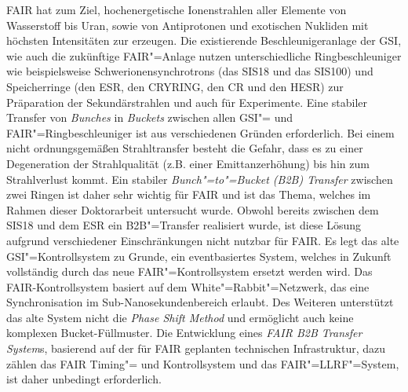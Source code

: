 FAIR hat zum Ziel, hochenergetische Ionenstrahlen aller Elemente von Wasserstoff bis Uran, sowie von Antiprotonen und exotischen Nukliden mit h\"ochsten  Intensit\"aten zur erzeugen. Die existierende Beschleunigeranlage der GSI, wie auch die zukünftige FAIR"=Anlage nutzen unterschiedliche Ringbeschleuniger wie beispielsweise Schwerionensynchrotrons (das SIS18 und das SIS100) und Speicherringe (den ESR, den CRYRING, den CR und den HESR) zur Pr\"aparation der Sekund\"arstrahlen und auch f\"ur Experimente.  Eine stabiler Transfer von \textit{Bunches} in \textit{Buckets} zwischen allen GSI"= und FAIR"=Ringbeschleuniger ist aus verschiedenen Gr\"unden erforderlich. Bei einem nicht ordnungsgem\"a\ss{}en Strahltransfer besteht die Gefahr, dass es zu einer Degeneration der Strahlqualit\"at (z.B.  einer Emittanzerh\"ohung) bis hin zum Strahlverlust kommt. Ein stabiler \textit{Bunch"=to"=Bucket (B2B) Transfer} zwischen zwei Ringen ist daher sehr wichtig f\"ur FAIR und ist das Thema, welches im Rahmen dieser Doktorarbeit untersucht wurde. Obwohl bereits zwischen dem SIS18 und dem ESR ein B2B"=Transfer realisiert wurde, ist diese L\"osung aufgrund verschiedener Einschr\"ankungen nicht nutzbar f\"ur FAIR. Es legt das alte GSI"=Kontrollsystem  zu Grunde, ein eventbasiertes System, welches in Zukunft vollst\"andig durch das neue FAIR"=Kontrollsystem ersetzt werden wird. Das FAIR-Kontrollsystem basiert auf dem White"=Rabbit"=Netzwerk, das eine Synchronisation im Sub-Nanosekundenbereich erlaubt. Des Weiteren unterst\"utzt das alte System nicht die \textit{Phase Shift Method} und erm\"oglicht auch keine komplexen Bucket-F\"ullmuster. Die Entwicklung eines \textit{FAIR B2B Transfer System}s, basierend auf der f\"ur FAIR geplanten technischen Infrastruktur, dazu z\"ahlen das FAIR Timing"= und Kontrollsystem und das FAIR"=LLRF"=System, ist daher unbedingt erforderlich.

